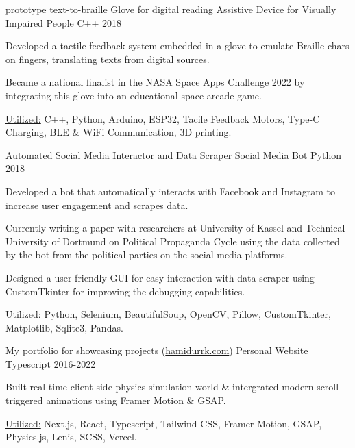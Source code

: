 \begin{cventries}
        \cventryprojects
        {prototype text-to-braille Glove for digital reading} %
        {Assistive Device for Visually Impaired People} %
        {C++} %
        {2018} %
        {
          \begin{cvitems} %
            \item { Developed a tactile feedback system embedded in a glove to emulate Braille chars on fingers, translating texts from digital sources.}
            \item { Became a national finalist in the NASA Space Apps Challenge 2022 by integrating this glove into an educational space arcade game.}
            \item {\underline{Utilized:} C++, Python, Arduino, ESP32, Tacile Feedback Motors, Type-C Charging, BLE \& WiFi Communication, 3D printing.}
          \end{cvitems}
          }
        \cventryprojects
        {Automated Social Media Interactor and Data Scraper} %
        {Social Media Bot} %
        {Python} %
        {2018} %
        {
          \begin{cvitems} %
            \item { Developed a bot that automatically interacts with Facebook and Instagram to increase user engagement and scrapes data.}
            \item { Currently writing a paper with researchers at University of Kassel and Technical University of Dortmund on Political Propaganda Cycle 
            using the data collected by the bot from the political parties on the social media platforms.}
            \item { Designed a user-friendly GUI for easy interaction with data scraper using CustomTkinter for improving the debugging capabilities.}
            \item {\underline{Utilized:} Python, Selenium, BeautifulSoup, OpenCV, Pillow, CustomTkinter, Matplotlib, Sqlite3, Pandas.}
          \end{cvitems}
          }

        
      \cventryprojects
      {My portfolio for showcasing projects  (\href{https://hamidurrk.com}{hamidurrk.com})} %
      {Personal Website} %
      {Typescript} %
      {2016-2022} %
      {
        \begin{cvitems}
          \item {Built real-time client-side physics simulation world \& intergrated modern scroll-triggered animations using Framer Motion \& GSAP.}
          \item {\underline{Utilized:} Next.js, React, Typescript, Tailwind CSS, Framer Motion, GSAP, Physics.js, Lenis, SCSS, Vercel.}
        \end{cvitems}
        }
\end{cventries}
